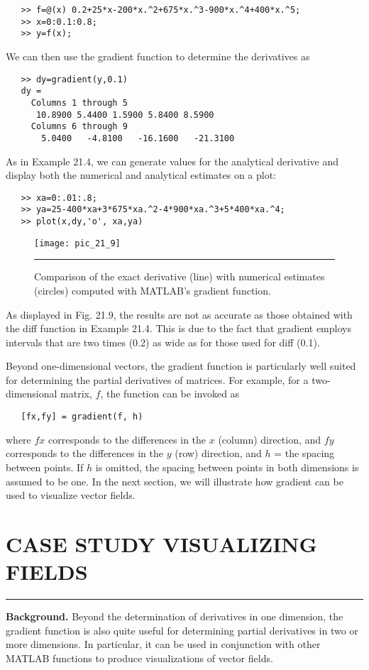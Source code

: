 \documentclass[../main.tex]{subfiles}
\begin{document}
\begin{verbatim}
   >> f=@(x) 0.2+25*x-200*x.^2+675*x.^3-900*x.^4+400*x.^5;
   >> x=0:0.1:0.8;
   >> y=f(x);
\end{verbatim}
We can then use the gradient function to determine the derivatives as
\begin{verbatim}
   >> dy=gradient(y,0.1)
   dy =
     Columns 1 through 5
      10.8900 5.4400 1.5900 5.8400 8.5900
     Columns 6 through 9
       5.0400   -4.8100   -16.1600   -21.3100
\end{verbatim}
As in Example 21.4, we can generate values for the analytical derivative and display both
the numerical and analytical estimates on a plot:
\begin{verbatim}
   >> xa=0:.01:.8;
   >> ya=25-400*xa+3*675*xa.^2-4*900*xa.^3+5*400*xa.^4;
   >> plot(x,dy,'o', xa,ya)
\end{verbatim}
\pagebreak
\begin{figure}[hbt!]
	\centering
	\texttt{[image: pic\_21\_9]}
	\caption{\textsf{Comparison of the exact derivative (line) with numerical estimates (circles) computed with
MATLAB's gradient function.}} \vspace{0.1in} \hrule 
	\label{pic.21.9}
\end{figure}
\vspace{0.2in}

As displayed in Fig. 21.9, the results are not as accurate as those obtained with the
diff function in Example 21.4. This is due to the fact that gradient employs intervals
that are two times (0.2) as wide as for those used for diff (0.1).

\vspace{0.4in}
Beyond one-dimensional vectors, the gradient function is particularly well suited
for determining the partial derivatives of matrices. For example, for a two-dimensional matrix, $f$, the function can be invoked as
\begin{verbatim}
   [fx,fy] = gradient(f, h)
\end{verbatim}
where $fx$ corresponds to the differences in the $x$ (column) direction, and $fy$ corresponds
to the differences in the $y$ (row) direction, and $h$ = the spacing between points. If $h$ is
omitted, the spacing between points in both dimensions is assumed to be one. In the next
section, we will illustrate how gradient can be used to visualize vector fields.

\vspace{0,6in}
\section{CASE STUDY VISUALIZING FIELDS}
\vspace{0,1in}
\hrule
\vspace{0,1in}
\textbf{Background.} Beyond the determination of derivatives in one dimension, the gradient
function is also quite useful for determining partial derivatives in two or more dimensions.
In particular, it can be used in conjunction with other MATLAB functions to produce visualizations of vector fields.
\end{document}

